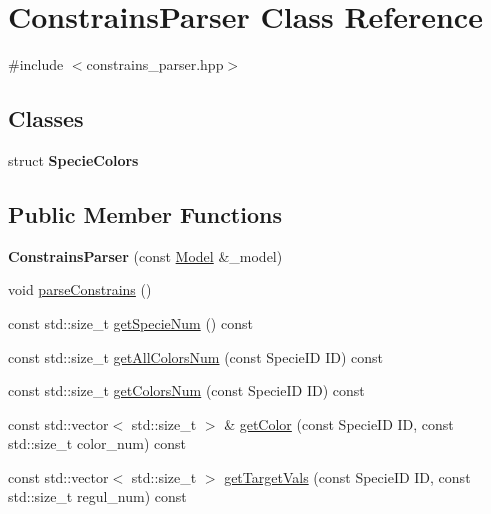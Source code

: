 \hypertarget{class_constrains_parser}{\section{Constrains\-Parser Class Reference}
\label{class_constrains_parser}
}


{\ttfamily \#include $<$constrains\-\_\-parser.\-hpp$>$}

\subsection*{Classes}
\begin{DoxyCompactItemize}
\item 
struct {\bfseries Specie\-Colors}
\end{DoxyCompactItemize}
\subsection*{Public Member Functions}
\begin{DoxyCompactItemize}
\item 
\hypertarget{class_constrains_parser_ae090c83175384de43b0b359efb3dc99a}{{\bfseries Constrains\-Parser} (const \hyperlink{class_model}{Model} \&\-\_\-model)}\label{class_constrains_parser_ae090c83175384de43b0b359efb3dc99a}

\item 
void \hyperlink{class_constrains_parser_af51ba37879812d01fdbf83153dcd7c0b}{parse\-Constrains} ()
\item 
const std\-::size\-\_\-t \hyperlink{class_constrains_parser_a471dbfd089826d265992b40538062285}{get\-Specie\-Num} () const 
\item 
const std\-::size\-\_\-t \hyperlink{class_constrains_parser_af23e388fa1d01538efc0ae2fd601356c}{get\-All\-Colors\-Num} (const Specie\-I\-D I\-D) const 
\item 
const std\-::size\-\_\-t \hyperlink{class_constrains_parser_a572ab122d8bd328598f62f78e1a40009}{get\-Colors\-Num} (const Specie\-I\-D I\-D) const 
\item 
const std\-::vector$<$ std\-::size\-\_\-t $>$ \& \hyperlink{class_constrains_parser_ab70e1d30731e9b5f10e11a678312d716}{get\-Color} (const Specie\-I\-D I\-D, const std\-::size\-\_\-t color\-\_\-num) const 
\item 
const std\-::vector$<$ std\-::size\-\_\-t $>$ \hyperlink{class_constrains_parser_ae2d87d0022583e6725b6a666cceafcbf}{get\-Target\-Vals} (const Specie\-I\-D I\-D, const std\-::size\-\_\-t regul\-\_\-num) const 
\end{DoxyCompactItemize}


